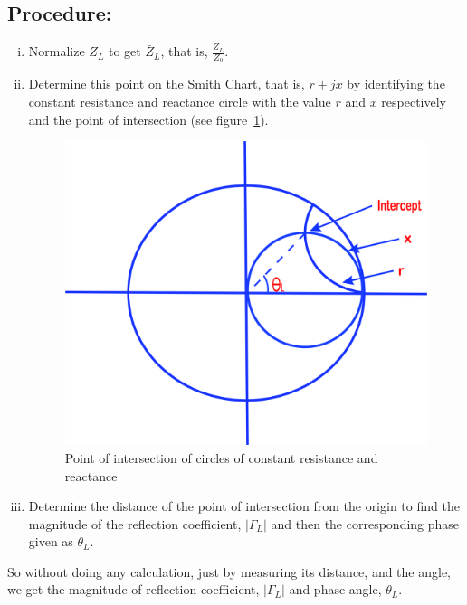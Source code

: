 \subsection*{Procedure:}
\begin{enumerate}[(i)]
\item Normalize $Z_{L}$ to get $\bar{Z}_{L}$, that is, $\frac{Z_{L}}{Z_{0}}$.
\item Determine this point on the Smith Chart, that is,  $r+jx$ by identifying the constant resistance and reactance circle with the value $r$ and $x$ respectively and the point of intersection (see figure~\ref{fig:lfds}).
\begin{figure}[h]
\centering
\includegraphics[width=0.7\linewidth]{./graphics/lfds}
\caption{Point of intersection of circles of constant resistance and reactance}
\label{fig:lfds}
\end{figure}

\item Determine the distance of the point of intersection from the origin to find the magnitude of the reflection coefficient, $|\Gamma_L|$ and then the corresponding phase given as $\theta_L$.
\end{enumerate}

So without doing any calculation, just by measuring its distance, and the angle, we get the magnitude of reflection coefficient, $|\Gamma_L|$
and phase angle, $\theta_L$. 

